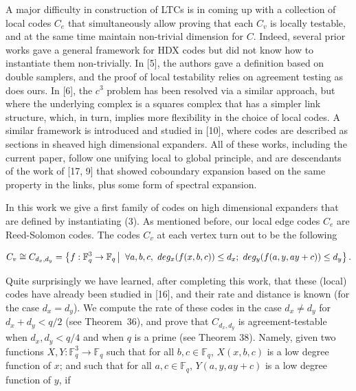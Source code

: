 \documentclass[10pt,a4paper]{article}
\begin{document}
A major difficulty in construction of LTCs is in coming up with a collection of local codes $C_{e}$ that simultaneously allow proving that each $C_{v}$ is locally testable, and at the same time maintain non-trivial dimension for $C$.
Indeed, several prior works gave a general framework for HDX codes but did not know how to instantiate them non-trivially. In [5], the authors gave a definition based on double samplers, and the proof of local testability relies on agreement testing as does ours. In [6], the $c^{3}$ problem has been resolved via a similar approach, but where the underlying complex is a squares complex that has a simpler link structure, which, in turn, implies more flexibility in the choice of local codes. A similar framework is introduced and studied in [10], where codes are described as sections in sheaved high dimensional expanders. All of these works, including the current paper, follow one unifying local to global principle, and are descendants of the work of [17, 9] that showed coboundary expansion based on the same property in the links, plus some form of spectral expansion.\par




In this work we give a first family of codes on high dimensional expanders that are defined by instantiating (3). As mentioned before, our local edge codes $C_{e}$ are Reed-Solomon codes. The codes $C_{v}$ at each vertex turn out to be the following\par


\[\begin{gathered}
C_{v}\cong C_{d_{x},d_{y}}=\left\{f:\mathbb{F}_{q}^{3}\to\mathbb{F}_{q}\left|\;\vphantom{f:\mathbb{F}_{q}^{3}\to\mathbb{F}_{q}\forall a,b,c,\,\,deg_{x}(f(x,b,c))\leq d_{x};\,\,deg_{y}(f(a,y,ay+c))\leq d_{y}}\right.\forall a,b,c,\,\,deg_{x}(f(x,b,c))\leq d_{x};\,\,deg_{y}(f(a,y,ay+c))\leq d_{y}\right\}.
\end{gathered}\]


Quite surprisingly we have learned, after completing this work, that these (local) codes have already been studied in [16], and their rate and distance is known (for the case $d_{x}=d_{y}$). We compute the rate of these codes in the case $d_{x}\not=d_{y}$ for $d_{x}+d_{y}<q/2$ (see Theorem 36), and prove that $C_{d_{x},d_{y}}$ is agreement-testable when $d_{x},d_{y}<q/4$ and when $q$ is a prime (see Theorem 38). Namely, given two functions $X,Y:\mathbb{F}_{q}^{3}\to\mathbb{F}_{q}$ such that
for all $b,c\in\mathbb{F}_{q}$, $X(x,b,c)$ is a low degree function of $x$; and such that for all $a,c\in\mathbb{F}_{q}$, $Y(a,y,ay+c)$ is a low degree function of $y$, if\par
\end{document}
